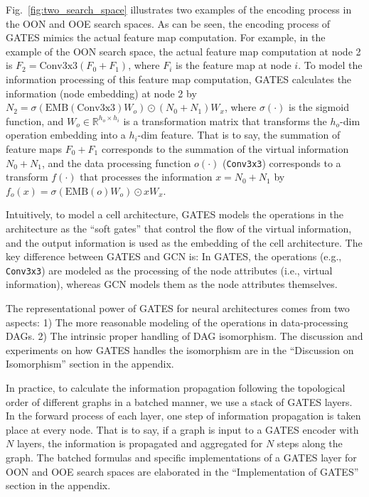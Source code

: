 \documentclass[runningheads]{llncs}
\begin{document}
Fig.~\ref{fig:two_search_space} illustrates two examples of the encoding process in the OON and OOE search spaces. As can be seen, the encoding process of GATES mimics the actual feature map computation.
For example, in the example of the OON search space, the actual feature map computation at node 2 is $F_2 = \mbox{Conv3x3}(F_0 + F_1)$, where $F_i$ is the feature map at node $i$.
To model the information processing of this feature map computation, GATES calculates the information (node embedding) at node 2 by $N_2 = \sigma(\mbox{EMB}(\mbox{Conv3x3})W_o) \odot (N_0 + N_1) W_x$, where $\sigma(\cdot)$ is the sigmoid function, and $W_o \in \mathbb{R}^{h_o \times h_i}$ is a transformation matrix that transforms the $h_o$-dim operation embedding into a $h_i$-dim feature.
That is to say, the summation of feature maps $F_0 + F_1$ corresponds to the summation of the virtual information $N_0 + N_1$, and the data processing function $o(\cdot)$ (\texttt{Conv3x3}) corresponds to a transform
$f(\cdot)$ that processes the information $x = N_0 + N_1$ by $f_o(x) = \sigma(\mbox{EMB}(o)W_o) \odot x W_x$.



Intuitively, to model a cell architecture, GATES models the operations in the architecture as the ``soft gates'' that control the flow of the virtual information, and the output information is used as the embedding of the cell architecture. 
The key difference between GATES and GCN is: In GATES, the operations (e.g., \texttt{Conv3x3}) are modeled as the processing of the node attributes (i.e., virtual information), whereas GCN models them as the node attributes themselves.


The representational power of GATES for neural architectures comes from two aspects: 1)
The more reasonable modeling of the operations in data-processing DAGs. 2) The intrinsic proper handling of DAG isomorphism. 
The discussion and experiments on how GATES handles the isomorphism are in the ``Discussion on Isomorphism'' section in the appendix.



In practice, to calculate the information propagation following the topological order of different graphs in a batched manner, we use a stack of GATES layers. In the forward process of each layer, one step of information propagation is taken place at every node. That is to say, if a graph is input to a GATES encoder with $N$ layers, the information is propagated and aggregated for $N$ steps along the graph. 
The batched formulas and specific implementations of a GATES layer for OON and OOE search spaces are elaborated in the ``Implementation of GATES'' section in the appendix.
\end{document}
